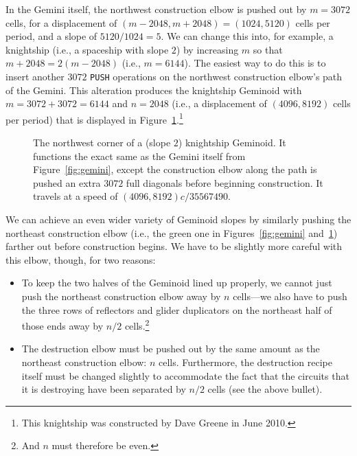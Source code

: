 In the Gemini itself, the northwest construction elbow is pushed out by $m = 3072$ cells, for a displacement of $(m-2048,m+2048) = (1024,5120)$ cells per period, and a slope of $5120/1024 = 5$. We can change this into, for example, a knightship (i.e., a spaceship with slope $2$) by increasing $m$ so that $m+2048 = 2(m-2048)$ (i.e., $m = 6144$). The easiest way to do this is to insert another $3072$ \texttt{PUSH} operations on the northwest construction elbow's path of the Gemini. This alteration produces the knightship Geminoid with $m = 3072 + 3072 = 6144$ and $n = 2048$ (i.e., a displacement of $(4096,8192)$ cells per period) that is displayed in Figure~\ref{fig:geminoid_knightship}.\footnote{This knightship was constructed by Dave Greene in June 2010.}

\begin{figure}[!phtb]
	\centering
	\caption{The northwest corner of a (slope $2$) knightship Geminoid. It functions the exact same as the Gemini itself from Figure~\ref{fig:gemini}, except the construction elbow along the  path is pushed an extra $3072$ full diagonals before beginning construction. It travels at a speed of $(4096,8192)c/35567490$.}\label{fig:geminoid_knightship}
\end{figure}

We can achieve an even wider variety of Geminoid slopes by similarly pushing the northeast construction elbow (i.e., the green one in Figures~\ref{fig:gemini} and~\ref{fig:geminoid_knightship}) farther out before construction begins. We have to be slightly more careful with this elbow, though, for two reasons:\smallskip

\begin{itemize}
	\item To keep the two halves of the Geminoid lined up properly, we cannot just push the northeast construction elbow away by $n$ cells---we also have to push the three rows of reflectors and glider duplicators on the northeast half of those ends away by $n/2$ cells.\footnote{And $n$ must therefore be even.}\smallskip
	
	\item The destruction elbow must be pushed out by the same amount as the northeast construction elbow: $n$ cells. Furthermore, the destruction recipe itself must be changed slightly to accommodate the fact that the circuits that it is destroying have been separated by $n/2$ cells (see the above bullet).\smallskip
\end{itemize}

